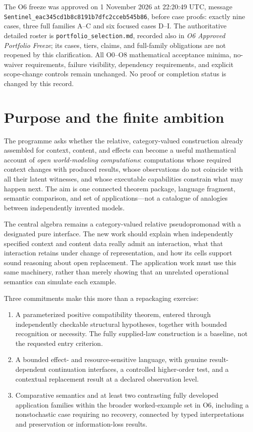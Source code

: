 \documentclass[11pt,a4paper]{article}
\begin{document}
The O6 freeze was approved on 1 November 2026 at 22:20:49 UTC, message
\texttt{Sentinel\_eac345cd1b8c8191b7dfc2cceb545b86}, before case proofs:
exactly nine cases, three full families A--C and six focused cases D--I.
The authoritative detailed roster is \texttt{portfolio\_selection.md},
recorded also in \emph{O6 Approved Portfolio Freeze}; its cases, tiers,
claims, and full-family obligations are not reopened by this clarification.
All O0--O8 mathematical acceptance minima, no-waiver requirements, failure
visibility, dependency requirements, and explicit scope-change controls
remain unchanged. No proof or completion status is changed by this record.

\section{Purpose and the finite ambition}\label{sec:purpose}

The programme asks whether the relative, category-valued construction already
assembled for context, content, and effects can become a useful mathematical
account of \emph{open world-modeling computations}: computations whose required
context changes with produced results, whose observations do not coincide with
all their latent witnesses, and whose executable capabilities constrain what
may happen next. The aim is one connected theorem package, language fragment,
semantic comparison, and set of applications---not a catalogue of analogies
between independently invented models.

The central algebra remains a category-valued relative pseudopromonad with a
designated pure interface. The new work should explain when independently
specified context and content data really admit an interaction, what that
interaction retains under change of representation, and how its cells support
sound reasoning about open replacement. The application work must use this
same machinery, rather than merely showing that an unrelated operational
semantics can simulate each example.

Three commitments make this more than a repackaging exercise:
\begin{enumerate}
\item A parameterized positive compatibility theorem, entered through
independently checkable structural hypotheses, together with bounded
recognition or necessity. The fully supplied-law construction is a baseline,
not the requested entry criterion.
\item A bounded effect- and resource-sensitive language, with genuine
result-dependent continuation interfaces, a controlled higher-order test,
and a contextual replacement result at a declared observation level.
\item Comparative semantics and at least two contrasting fully developed
application families within the broader worked-example set in O6, including
a nonstochastic case requiring no recovery, connected by typed
interpretations and preservation or information-loss results.
\end{enumerate}
\end{document}
